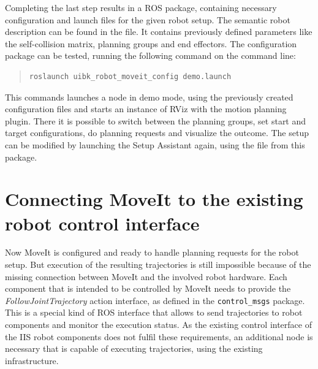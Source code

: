 Completing the last step results in a ROS package, containing necessary configuration and launch files for the given robot setup. The semantic robot description can be found in the  file. It contains previously defined parameters like the self-collision matrix, planning groups and end effectors. The configuration package can be tested, running the following command on the command line:
\begin{quote}
\begin{verbatim}
roslaunch uibk_robot_moveit_config demo.launch
\end{verbatim}
\end{quote}
This commands launches a  node in demo mode, using the previously created configuration files and starts an instance of RViz with the motion planning plugin. There it is possible to switch between the planning groups, set start and target configurations, do planning requests and visualize the outcome. The setup can be modified by launching the Setup Assistant again, using the  file from this package.

\section{Connecting MoveIt to the existing robot control interface}

Now MoveIt is configured and ready to handle planning requests for the robot setup. But execution of the resulting trajectories is still impossible because of the missing connection between MoveIt and the involved robot hardware. Each component that is intended to be controlled by MoveIt needs to provide the \emph{FollowJointTrajectory} action interface, as defined in the \texttt{control\_msgs} package. This is a special kind of ROS interface that allows to send trajectories to robot components and monitor the execution status. As the existing control interface of the IIS robot components does not fulfil these requirements, an additional node is necessary that is capable of executing trajectories, using the existing infrastructure.\\

